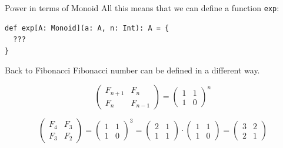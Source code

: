 \documentclass[presentation,aspectratio=169,smaller]{beamer}
\begin{document}
\begin{frame}[label={sec:orgd571f66},fragile]{Power in terms of Monoid}
 All this means that we can define a function \texttt{exp}:

\begin{verbatim}
def exp[A: Monoid](a: A, n: Int): A = {
  ???
}
\end{verbatim}
\end{frame}

\begin{frame}[label={sec:org651d88f}]{Back to Fibonacci}
Fibonacci number can be defined in a different way.

\begin{equation*}
  \begin{pmatrix}
    F_{n+1} & F_n \\
    F_n & F_{n-1}
  \end{pmatrix} =
  \begin{pmatrix}
    1 & 1 \\
    1 & 0
  \end{pmatrix} ^ n
\end{equation*}

\pause

\begin{equation*}
  \begin{pmatrix}
    F_4 & F_3 \\
    F_3 & F_2
  \end{pmatrix} =
  \begin{pmatrix}
    1 & 1 \\
    1 & 0
  \end{pmatrix} ^ 3 =
  \begin{pmatrix}
    2 & 1 \\
    1 & 1
  \end{pmatrix} \cdot
  \begin{pmatrix}
    1 & 1 \\
    1 & 0
  \end{pmatrix} =
  \begin{pmatrix}
    3 & 2 \\
    2 & 1
  \end{pmatrix}
\end{equation*}
\end{frame}
\end{document}
